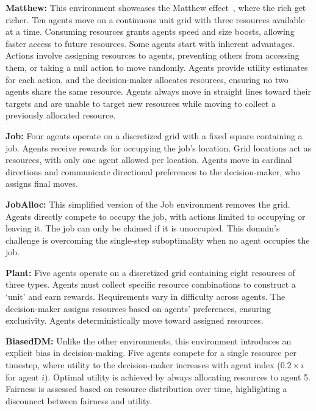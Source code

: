 \noindent \textbf{Matthew:} This environment showcases the Matthew effect~\citep{rigney2010matthew, gao2023matthew}, where the rich get richer. Ten agents move on a continuous unit grid with three resources available at a time. Consuming resources grants agents speed and size boosts, allowing faster access to future resources. Some agents start with inherent advantages. Actions involve assigning resources to agents, preventing others from accessing them, or taking a null action to move randomly. Agents provide utility estimates for each action, and the decision-maker allocates resources, ensuring no two agents share the same resource. Agents always move in straight lines toward their targets and are unable to target new resources while moving to collect a previously allocated resource.%

\noindent \textbf{Job:} Four agents operate on a discretized grid with a fixed square containing a job. Agents receive rewards for occupying the job's location. Grid locations act as resources, with only one agent allowed per location. Agents move in cardinal directions and communicate directional preferences to the decision-maker, who assigns final moves.

\noindent \textbf{JobAlloc:} This simplified version of the Job environment removes the grid. Agents directly compete to occupy the job, with actions limited to occupying or leaving it. The job can only be claimed if it is unoccupied. This domain's challenge is overcoming the single-step suboptimality when no agent occupies the job.

\noindent \textbf{Plant:} Five agents operate on a discretized grid containing eight resources of three types. Agents must collect specific resource combinations to construct a `unit' and earn rewards. Requirements vary in difficulty across agents. The decision-maker assigns resources based on agents' preferences, ensuring exclusivity. Agents deterministically move toward assigned resources.

\noindent \textbf{BiasedDM:} Unlike the other environments, this environment introduces an explicit bias in decision-making. Five agents compete for a single resource per timestep, where utility to the decision-maker increases with agent index ($0.2 \times i$ for agent $i$). Optimal utility is achieved by always allocating resources to agent 5. Fairness is assessed based on resource distribution over time, highlighting a disconnect between fairness and utility.



